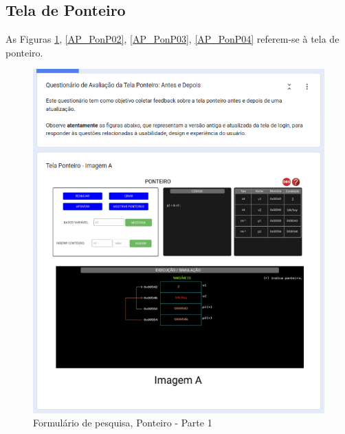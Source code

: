 \newpage

\subsection{Tela de Ponteiro}

As Figuras \ref{AP_PonP01}, \ref{AP_PonP02}, \ref{AP_PonP03}, \ref{AP_PonP04} referem-se à tela de ponteiro.

\begin{figure}[!h]
	\begin{center}
	    \includegraphics[scale=0.6]{figs/Form/19.png}
	\end{center}
	\caption{\label{AP_PonP01}Formulário de pesquisa, Ponteiro - Parte 1}
\end{figure}

\newpage

